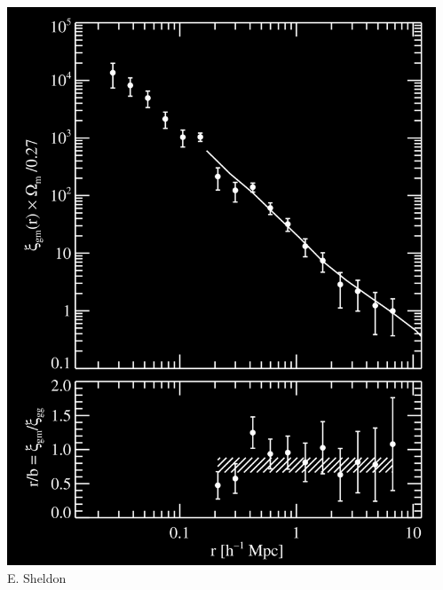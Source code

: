 \documentclass{beamer}
\begin{document}
{\begin{columns}
\begin{column}{0.5\textwidth}
        \end{column}
        \begin{column}{0.5\textwidth}
            \begin{center}
                \includegraphics[width=\textwidth]{xi_all_idit_bias_icolor-crop.png}
                \newline
                {\tiny E. Sheldon}
            \end{center}
        \end{column}

    \end{columns}


}
\end{document}
